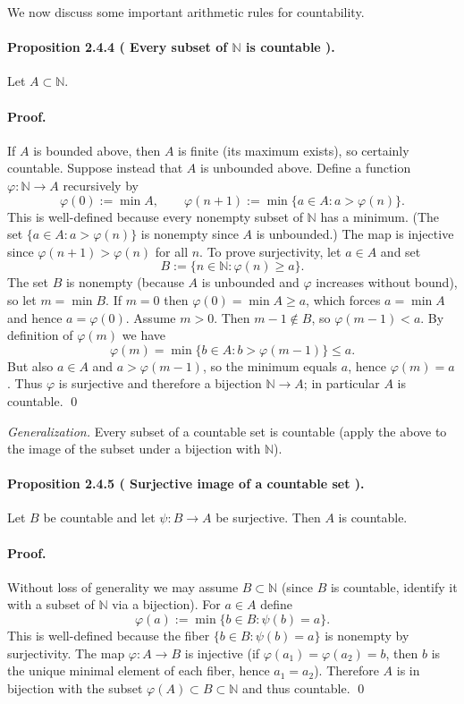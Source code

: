 \documentclass[12pt,a4paper]{article}
\newcommand{\N}{\mathbb{N}}
\newcommand{\NumberedProposition}[3]{%
\paragraph*{Proposition #1 ( #2 ).} #3\par}
\theoremstyle{plain}
\theoremstyle{definition}
\theoremstyle{remark}
\begin{document}
We now discuss some important arithmetic rules for countability.

\NumberedProposition{2.4.4}{Every subset of $\N$ is countable}{Let $A\subset \N$.}

\paragraph{Proof.} If $A$ is bounded above, then $A$ is finite (its maximum exists), so certainly countable. Suppose instead that $A$ is unbounded above. Define a function $\varphi: \N\to A$ recursively by
\[
	\varphi(0) := \min A, \qquad \varphi(n+1) := \min\{ a\in A : a> \varphi(n)\}.
\]
This is well-defined because every nonempty subset of $\N$ has a minimum. (The set $\{a\in A : a>\varphi(n)\}$ is nonempty since $A$ is unbounded.) The map is injective since $\varphi(n+1)>\varphi(n)$ for all $n$. To prove surjectivity, let $a\in A$ and set
\[
	B := \{ n\in\N : \varphi(n) \ge a\}.
\]
The set $B$ is nonempty (because $A$ is unbounded and $\varphi$ increases without bound), so let $m=\min B$. If $m=0$ then $\varphi(0)=\min A \ge a$, which forces $a=\min A$ and hence $a=\varphi(0)$. Assume $m>0$. Then $m-1\notin B$, so $\varphi(m-1) < a$. By definition of $\varphi(m)$ we have
\[
	\varphi(m)= \min\{ b\in A : b>\varphi(m-1)\} \le a.
\]
But also $a\in A$ and $a>\varphi(m-1)$, so the minimum equals $a$, hence $\varphi(m)=a$. Thus $\varphi$ is surjective and therefore a bijection $\N\to A$; in particular $A$ is countable. \qed

\emph{Generalization.} Every subset of a countable set is countable (apply the above to the image of the subset under a bijection with $\N$).

\NumberedProposition{2.4.5}{Surjective image of a countable set}{Let $B$ be countable and let $\psi: B\to A$ be surjective. Then $A$ is countable.}

\paragraph{Proof.} Without loss of generality we may assume $B\subset \N$ (since $B$ is countable, identify it with a subset of $\N$ via a bijection). For $a\in A$ define
\[
	\varphi(a) := \min\{ b\in B : \psi(b)=a \}.
\]
This is well-defined because the fiber $\{b\in B: \psi(b)=a\}$ is nonempty by surjectivity. The map $\varphi: A\to B$ is injective (if $\varphi(a_1)=\varphi(a_2)=b$, then $b$ is the unique minimal element of each fiber, hence $a_1=a_2$). Therefore $A$ is in bijection with the subset $\varphi(A)\subset B\subset \N$ and thus countable. \qed
\end{document}
